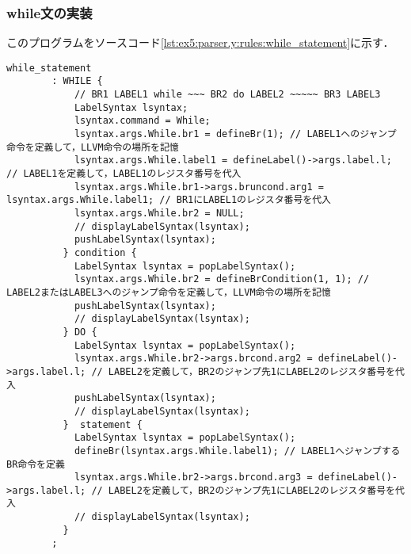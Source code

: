 \documentclass[uplatex]{jsarticle}
\begin{document}
\subsubsection{while文の実装}
このプログラムをソースコード\ref{lst:ex5:parser.y:rules:while_statement}に示す．
\begin{lstlisting}[caption=while文の処理,label=lst:ex5:parser.y:rules:while_statement]
while_statement
        : WHILE {
            // BR1 LABEL1 while ~~~ BR2 do LABEL2 ~~~~~ BR3 LABEL3
            LabelSyntax lsyntax;
            lsyntax.command = While;
            lsyntax.args.While.br1 = defineBr(1); // LABEL1へのジャンプ命令を定義して，LLVM命令の場所を記憶
            lsyntax.args.While.label1 = defineLabel()->args.label.l; // LABEL1を定義して，LABEL1のレジスタ番号を代入
            lsyntax.args.While.br1->args.bruncond.arg1 = lsyntax.args.While.label1; // BR1にLABEL1のレジスタ番号を代入
            lsyntax.args.While.br2 = NULL;
            // displayLabelSyntax(lsyntax);
            pushLabelSyntax(lsyntax);
          } condition {
            LabelSyntax lsyntax = popLabelSyntax();
            lsyntax.args.While.br2 = defineBrCondition(1, 1); // LABEL2またはLABEL3へのジャンプ命令を定義して，LLVM命令の場所を記憶
            pushLabelSyntax(lsyntax);
            // displayLabelSyntax(lsyntax);
          } DO {
            LabelSyntax lsyntax = popLabelSyntax();
            lsyntax.args.While.br2->args.brcond.arg2 = defineLabel()->args.label.l; // LABEL2を定義して，BR2のジャンプ先1にLABEL2のレジスタ番号を代入
            pushLabelSyntax(lsyntax);
            // displayLabelSyntax(lsyntax);
          }  statement {
            LabelSyntax lsyntax = popLabelSyntax();
            defineBr(lsyntax.args.While.label1); // LABEL1へジャンプするBR命令を定義
            lsyntax.args.While.br2->args.brcond.arg3 = defineLabel()->args.label.l; // LABEL2を定義して，BR2のジャンプ先1にLABEL2のレジスタ番号を代入
            // displayLabelSyntax(lsyntax);
          }
        ;
\end{lstlisting}
\end{document}
